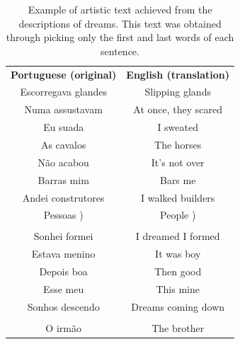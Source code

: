 \documentclass[12pt,fleqn]{article}
\begin{document}
\begin{table}[H] %
	\caption{Example of artistic text achieved from the descriptions of dreams.
	This text was obtained through picking only the first and last words of each sentence.}\label{tab:comecoFinal}
\vspace{12pt}
\centering{}
 \small
\begin{tabular}{  c | c }
	\textbf{Portuguese (original)}      &                                                \textbf{English (translation)} \\
Escorregava glandes              &                                                Slipping glands         \\
Numa assustavam                  &                                                At once, they scared    \\
Eu suada                         &                                                I sweated               \\
As cavalos                       &                                                The horses              \\
Não acabou                       &                                                It's not over           \\
Barras mim                       &                                                Bars me                 \\
Andei construtores               &                                                I walked builders       \\
Pessoas )                        &                                                People  )               \\
  & \\
Sonhei formei                    &                                                I dreamed I formed      \\
Estava menino                    &                                                It was boy              \\
Depois boa                       &                                                Then good               \\
Esse meu                         &                                                This mine               \\
Sonhos descendo                  &                                                Dreams coming down      \\
  & \\
O irmão                          &                                                The brother             \\

\end{tabular}
\end{table}
\end{document}
